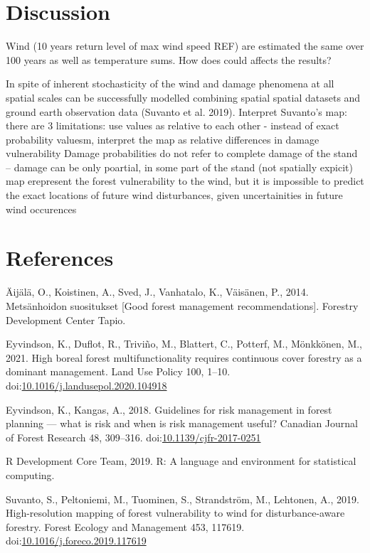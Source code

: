 \documentclass[]{elsarticle} %
\begin{document}
\section{Discussion}\label{discussion}

Wind (10 years return level of max wind speed REF) are estimated the
same over 100 years as well as temperature sums. How does could affects
the results?

In spite of inherent stochasticity of the wind and damage phenomena at
all spatial scales can be successfully modelled combining spatial
spatial datasets and ground earth observation data (Suvanto et al.
2019). Interpret Suvanto's map: there are 3 limitations: use values as
relative to each other - instead of exact probability valuesm, interpret
the map as relative differences in damage vulnerability Damage
probabilities do not refer to complete damage of the stand -- damage can
be only poartial, in some part of the stand (not spatially expicit) map
erepresent the forest vulnerability to the wind, but it is impossible to
predict the exact locations of future wind disturbances, given
uncertainities in future wind occurences

\section*{References}\label{references}

\hypertarget{refs}{}
\hypertarget{ref-Aijala2014a}{}
Äijälä, O., Koistinen, A., Sved, J., Vanhatalo, K., Väisänen, P., 2014.
Metsänhoidon suositukset {[}Good forest management recommendations{]}.
Forestry Development Center Tapio.

\hypertarget{ref-Eyvindson2020}{}
Eyvindson, K., Duflot, R., Triviño, M., Blattert, C., Potterf, M.,
Mönkkönen, M., 2021. High boreal forest multifunctionality requires
continuous cover forestry as a dominant management. Land Use Policy 100,
1--10.
doi:\href{https://doi.org/10.1016/j.landusepol.2020.104918}{10.1016/j.landusepol.2020.104918}

\hypertarget{ref-Eyvindson2018}{}
Eyvindson, K., Kangas, A., 2018. Guidelines for risk management in
forest planning --- what is risk and when is risk management useful?
Canadian Journal of Forest Research 48, 309--316.
doi:\href{https://doi.org/10.1139/cjfr-2017-0251}{10.1139/cjfr-2017-0251}

\hypertarget{ref-RDevelopmentCoreTeam2019}{}
R Development Core Team, 2019. R: A language and environment for
statistical computing.

\hypertarget{ref-Suvanto2019}{}
Suvanto, S., Peltoniemi, M., Tuominen, S., Strandström, M., Lehtonen,
A., 2019. High-resolution mapping of forest vulnerability to wind for
disturbance-aware forestry. Forest Ecology and Management 453, 117619.
doi:\href{https://doi.org/10.1016/j.foreco.2019.117619}{10.1016/j.foreco.2019.117619}
\end{document}

